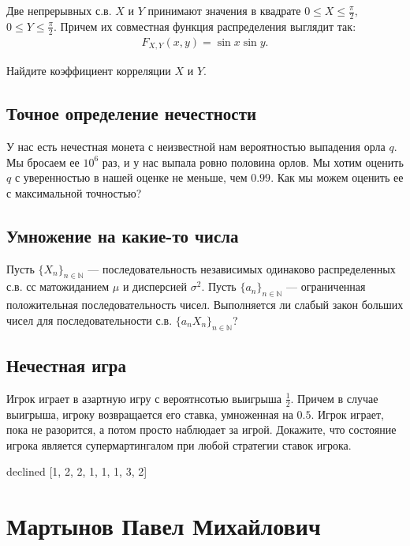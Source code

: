 \documentclass[12pt]{article}
\newcommand\N{\mathbb{N}}
\begin{document}
Две непрерывных с.в. $X$ и $Y$ принимают значения в квадрате $0 \le X \le \frac{\pi}{2},$ $0 \le Y \le \frac{\pi}{2}$. Причем их совместная функция распределения выглядит так:
\begin{align*}
    F_{X, Y} (x, y) = \sin x \sin y.
\end{align*}

Найдите коэффициент корреляции $X$ и $Y$.



\subsection{Точное определение нечестности}

У нас есть нечестная монета с неизвестной нам вероятностью выпадения орла $q$. Мы бросаем ее $10^6$ раз, и у нас выпала ровно половина орлов. Мы хотим оценить $q$ с уверенностью в нашей оценке не меньше, чем $0.99$. Как мы можем оценить ее с максимальной точностью? 



\subsection{Умножение на какие-то числа}

Пусть $\{X_n\}_{n \in \N}$ --- последовательность независимых одинаково распределенных с.в. сс матожиданием $\mu$ и дисперсией $\sigma^2$. Пусть $\{a_n\}_{n \in \N}$ --- ограниченная положительная последовательность чисел. Выполняется ли слабый закон больших чисел для последовательности с.в. $\{a_n X_n\}_{n \in \N}$?



\subsection{Нечестная игра}

Игрок играет в азартную игру с вероятнсотью выигрыша $\frac{1}{2}$. Причем в случае выигрыша, игроку возвращается его ставка, умноженная на $0.5$. Игрок играет, пока не разорится, а потом просто наблюдает за игрой. Докажите, что состояние игрока является супермартингалом при любой стратегии ставок игрока.



\newpage
declined  [1, 2, 2, 1, 1, 1, 3, 2]
\section{Мартынов Павел Михайлович}
\end{document}
